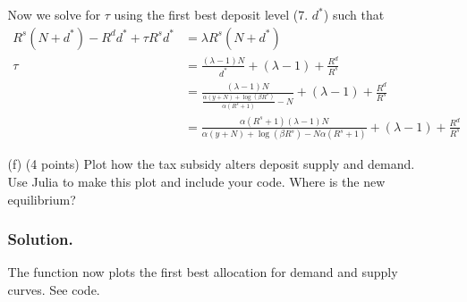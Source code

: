 \documentclass[12pt]{article}
\begin{document}
\begin{enumerate}
\begin{enumerate}
        Now we solve for $\tau$ using the first best deposit level (7. $d^*$) such that  
        \begin{align*}
            R^s(N+d^*) - R^dd^* + \tau R^s d^* &= \lambda R^s (N+d^*)
            \\ \tau &= \frac{\left(\lambda-1\right)N}{d^{*}}+\left(\lambda-1\right)+\frac{R^{d}}{R^{s}}
            \\ &= \frac{\left(\lambda-1\right)N}{\frac{\alpha\left(y+N\right)+\log\left(\beta R^{s}\right)}{\alpha\left(R^{s}+1\right)}-N}+\left(\lambda-1\right)+\frac{R^{d}}{R^{s}}
             \\ &= \frac{\alpha\left(R^{s}+1\right)\left(\lambda-1\right)N}{\alpha\left(y+N\right)+\log\left(\beta R^{s}\right)-N\alpha\left(R^{s}+1\right)}+\left(\lambda-1\right)+\frac{R^{d}}{R^{s}}
        \end{align*}
        
        \item[(f)] {(4 points)} Plot how the tax subsidy alters deposit supply and demand. Use Julia to make this plot and include your code. Where is the new equilibrium?
        \subsubsection*{Solution.}

        The function now plots the first best allocation for demand and supply curves. See code. 
        
        
    \end{enumerate}

\end{enumerate}
\end{document}
